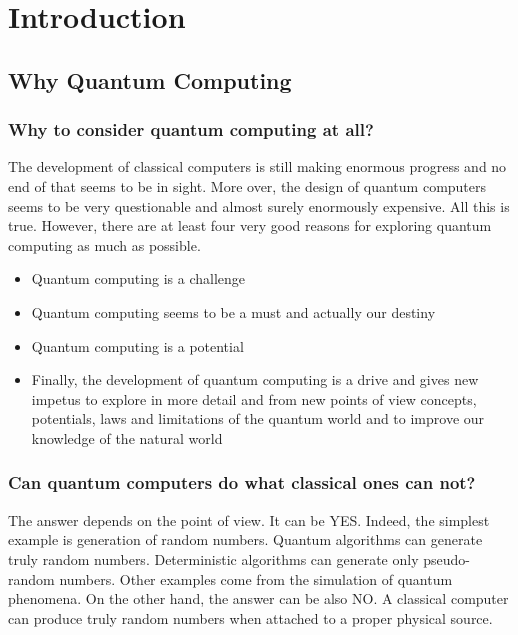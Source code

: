 \documentclass[12pt]{book}
\begin{document}
\tableofcontents

\chapter{Introduction}

\section{Why Quantum Computing}

\subsection{
Why to consider quantum computing at all?
}

The development of classical
computers is still making enormous progress and no end of that seems to be in sight. More
over, the design of quantum computers seems to be very questionable and almost surely
enormously expensive. All this is true. However, there are at least four very good reasons
for exploring quantum computing as much as possible.

\begin{itemize}
	\item Quantum computing is a challenge
	\item Quantum computing seems to be a must and actually our destiny
	\item Quantum computing is a potential
	\item Finally, the development of quantum computing is a drive and gives new impetus
to explore in more detail and from new points of view concepts, potentials, laws and limitations of the quantum world and to improve our knowledge of the natural world
\end{itemize}


\subsection{
Can quantum computers do what classical ones can not?
}

The answer depends on the point of view. It can be YES. Indeed, the simplest example is generation of
random numbers. Quantum algorithms can generate truly random numbers. Deterministic
algorithms can generate only pseudo-random numbers. Other examples come from the simulation of quantum phenomena. On the other hand, the answer can be also NO. A classical
computer can produce truly random numbers when attached to a proper physical source.
\end{document}
